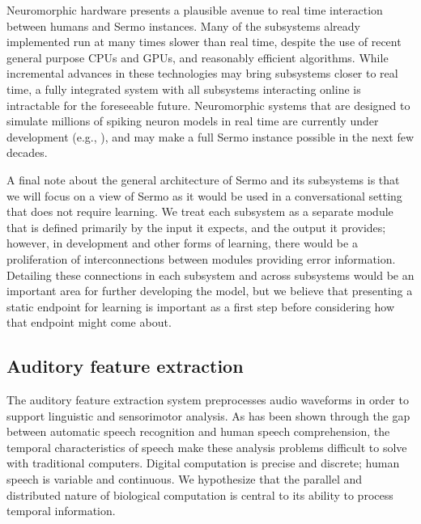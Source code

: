 Neuromorphic hardware
presents a plausible avenue
to real time interaction
between humans and Sermo instances.
Many of the subsystems already implemented
run at many times slower than real time,
despite the use of recent general purpose
CPUs and GPUs,
and reasonably efficient algorithms.
While incremental advances
in these technologies may
bring subsystems closer to real time,
a fully integrated system
with all subsystems interacting online
is intractable for the foreseeable future.
Neuromorphic systems that are designed
to simulate millions of spiking neuron models
in real time
are currently under development
(e.g., \citealt{furber2013,benjamin2014}),
and may make a full Sermo instance
possible in the next few decades.

A final note about
the general architecture of Sermo
and its subsystems
is that we will focus on a view
of Sermo as it would be used
in a conversational setting
that does not require learning.
We treat each subsystem as a separate
module that is defined primarily
by the input it expects,
and the output it provides;
however, in development and other forms
of learning,
there would be a proliferation of
interconnections between modules
providing error information.
Detailing these connections
in each subsystem and across subsystems
would be an important area
for further developing the model,
but we believe that presenting
a static endpoint for learning
is important as a first step
before considering
how that endpoint might come about.

\subsection{Auditory feature extraction}
\label{sec:model-ncc}


The auditory feature extraction system
preprocesses audio waveforms
in order to support
linguistic and sensorimotor analysis.
As has been shown through
the gap between
automatic speech recognition
and human speech comprehension,
the temporal characteristics
of speech
make these analysis problems
difficult to solve
with traditional computers.
Digital computation is precise and discrete;
human speech is variable and continuous.
We hypothesize that the
parallel and distributed nature
of biological computation
is central to its
ability to process temporal information.

